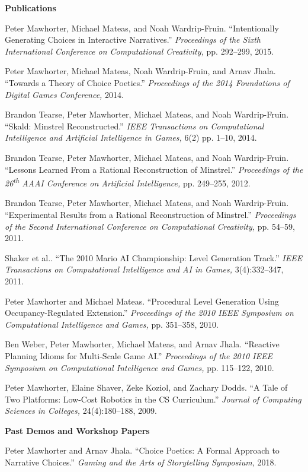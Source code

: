 \documentclass[11pt]{article}
\newenvironment{pubs}[1]{%
  \vspace{8pt}\textbf{\Large #1} \hrulefill\vspace{6pt}
  \begin{adjustwidth}{14pt}{0pt}
  \setlength{\parskip}{4pt}
  \setlength{\parindent}{-8pt}
}{%
  \end{adjustwidth}
}
\newcommand{\fullpub}[5]{%
\begin{samepage}
#1. ``#2.'' \textit{#3,} #4, #5.

\end{samepage}%
}
\newcommand{\nppub}[4]{%
\begin{samepage}
#1. ``#2.'' \textit{#3,} #4.

\end{samepage}%
}
\newcommand{\heading}[1]{\textbf{\large #1}\vspace{4pt}}
\newcommand{\tsup}[1]{\textsuperscript{#1}}
\begin{document}
\begin{pubs}{Publications}
\fullpub{Peter Mawhorter, Michael Mateas, and Noah Wardrip-Fruin}{Intentionally Generating Choices in Interactive Narratives}{Proceedings of the Sixth International Conference on Computational Creativity}{pp. 292--299}{2015}

\nppub{Peter Mawhorter, Michael Mateas, Noah Wardrip-Fruin, and Arnav Jhala}{Towards a Theory of Choice Poetics}{Proceedings of the 2014 Foundations of Digital Games Conference}{2014}

\fullpub{Brandon Tearse, Peter Mawhorter, Michael Mateas, and Noah Wardrip-Fruin}{Skald: Minstrel Reconstructed}{IEEE Transactions on Computational Intelligence and Artificial Intelligence in Games}{6(2) pp. 1--10}{2014}

\fullpub{Brandon Tearse, Peter Mawhorter, Michael Mateas, and Noah Wardrip-Fruin}{Lessons Learned From a Rational Reconstruction of Minstrel}{Proceedings of the 26\tsup{th} AAAI Conference on Artificial Intelligence}{pp. 249--255}{2012}

\fullpub{Brandon Tearse, Peter Mawhorter, Michael Mateas, and Noah Wardrip-Fruin}{Experimental Results from a Rational Reconstruction of Minstrel}{Proceedings of the Second International Conference on Computational Creativity}{pp. 54--59}{2011}

\fullpub{Shaker et al.}{The 2010 Mario AI Championship: Level Generation Track}{IEEE Transactions on Computational Intelligence and AI in Games}{3(4):332--347}{2011}

\fullpub{Peter Mawhorter and Michael Mateas}{Procedural Level Generation Using Occupancy-Regulated Extension}{Proceedings of the 2010 IEEE Symposium on Computational Intelligence and Games}{pp. 351--358}{2010}

\fullpub{Ben Weber, Peter Mawhorter, Michael Mateas, and Arnav Jhala}{Reactive Planning Idioms for Multi-Scale Game AI}{Proceedings of the 2010 IEEE Symposium on Computational Intelligence and Games}{pp. 115--122}{2010}

\fullpub{Peter Mawhorter, Elaine Shaver, Zeke Koziol, and Zachary Dodds}{A Tale of Two Platforms: Low-Cost Robotics in the CS Curriculum}{Journal of Computing Sciences in Colleges}{24(4):180--188}{2009}

\vspace{6pt}
\heading{Past Demos and Workshop Papers}

\nppub{Peter Mawhorter and Arnav Jhala}{Choice Poetics: A Formal Approach to Narrative Choices}{Gaming and the Arts of Storytelling Symposium}{2018}


\end{pubs}
\end{document}
